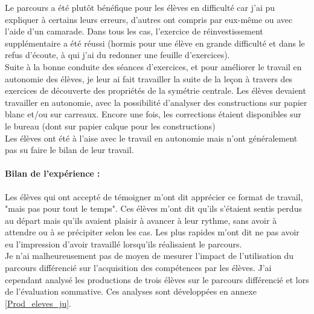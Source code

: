 Le parcours a été plutôt bénéfique pour les élèves en difficulté car j'ai pu expliquer à certains leurs erreurs, d'autres ont compris par eux-même ou avec l'aide d'un camarade. Dans tous les cas, l'exercice de réinvestissement supplémentaire a été réussi (hormis pour une élève en grande difficulté et dans le refus d'écoute, à qui j'ai du redonner une feuille d'exercices).\\
Suite à la bonne conduite des séances d'exercices, et pour améliorer le travail en autonomie des élèves, je leur ai fait travailler la suite de la leçon à travers des exercices de découverte des propriétés de la symétrie centrale. Les élèves devaient travailler en autonomie, avec la possibilité d'analyser des constructions sur papier blanc et/ou sur carreaux. Encore une fois, les corrections étaient disponibles sur le bureau (dont sur papier calque pour les constructions)\\
Les élèves ont été à l'aise avec le travail en autonomie mais n'ont généralement pas su faire le bilan de leur travail.

\paragraph{Bilan de l'expérience :}Les élèves qui ont accepté de témoigner m'ont dit apprécier ce format de travail, "mais pas pour tout le temps". Ces élèves m'ont dit qu'ils s'étaient sentis perdus au départ mais qu'ils avaient plaisir à avancer à leur rythme, sans avoir  à attendre ou à se précipiter selon les cas. Les plus rapides m'ont dit ne pas avoir eu l'impression d'avoir travaillé lorsqu'ils réalisaient le parcours.\\
Je n'ai malheureusement pas de moyen de mesurer l'impact de l'utilisation du parcours différencié sur l'acquisition des compétences par les élèves. J'ai cependant analysé les productions de trois élèves sur le parcours différencié et lors de l'évaluation sommative. Ces analyses sont développées en annexe \ref{Prod_eleves_ju}.

